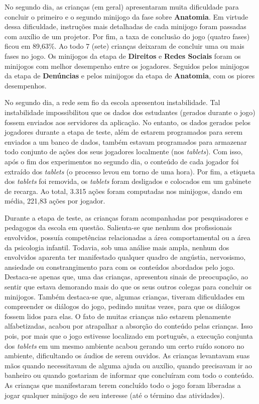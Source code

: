 No segundo dia, as crianças (em geral) apresentaram muita dificuldade para concluir o primeiro e o segundo minijogo da fase sobre \textbf{Anatomia}. Em virtude dessa dificuldade, instruções mais detalhadas de cada minijogo foram passadas com auxílio de um projetor. Por fim, a taxa de conclusão do jogo (quatro fases) ficou em 89,63\%. Ao todo 7 (sete) crianças deixaram de concluir uma ou mais fases no jogo. Os minijogos da etapa de \textbf{Direitos} e \textbf{Redes Sociais} foram os minijogos com melhor desempenho entre os jogadores. Seguidos pelos minijogos da etapa de \textbf{Denúncias} e pelos minijogos da etapa de \textbf{Anatomia}, com os piores desempenhos. 

No segundo dia, a rede sem fio da escola apresentou instabilidade. Tal instabilidade impossibilitou que os dados dos estudantes (gerados durante o jogo) fossem enviados aos servidores da aplicação. No entanto, os dados gerados pelos jogadores durante a etapa de teste, além de estarem programados para serem enviados a um banco de dados, também estavam programados para armazenar todo conjunto de ações dos seus jogadores localmente (nos \textit{tablets}). Com isso, após o fim dos experimentos no segundo dia, o conteúdo de cada jogador foi extraído dos \textit{tablets} (o processo levou em torno de uma hora). Por fim, a etiqueta dos \textit{tablets} foi removida, os \textit{tablets} foram desligados e colocados em um gabinete de recarga. Ao total, 3.315 ações foram computadas nos minijogos, dando em média, 221,83 ações por jogador.

Durante a etapa de teste, as crianças foram acompanhadas por pesquisadores e pedagogos da escola em questão. Salienta-se que nenhum dos profissionais envolvidos, possuía competências relacionadas a área comportamental ou a área da psicologia infantil. Todavia, sob uma análise mais ampla, nenhum dos envolvidos aparenta ter manifestado qualquer quadro de angústia, nervosismo, ansiedade ou constrangimento para com os conteúdos abordados pelo jogo. Destaca-se apenas que, uma das crianças, apresentou sinais de preocupação, ao sentir que estava demorando mais do que os seus outros colegas para concluir os minijogos. Também destaca-se que, algumas crianças, tiveram dificuldades em compreender os diálogos do jogo, pedindo muitas vezes, para que os diálogos fossem lidos para elas. O fato de muitas crianças não estarem plenamente alfabetizadas, acabou por atrapalhar a absorção do conteúdo pelas crianças. Isso pois, por mais que o jogo estivesse localizado em português, a execução conjunta dos \textit{tablets} em um mesmo ambiente acabou gerando um certo ruído sonoro no ambiente, dificultando os áudios de serem ouvidos. As crianças levantavam suas mãos quando necessitavam de alguma ajuda ou auxílio, quando precisavam ir ao banheiro ou quando gostariam de informar que concluíram com todo o conteúdo. As crianças que manifestaram terem concluído todo o jogo foram liberadas a jogar qualquer minijogo de seu interesse (até o término das atividades). 

